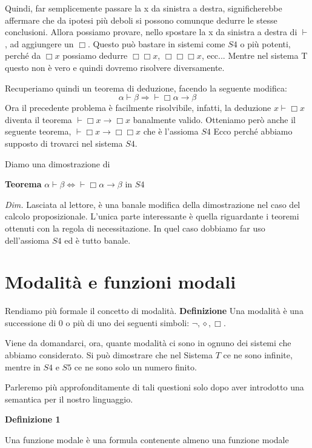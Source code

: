 \documentclass[a4paper, 12pt]{article}
\begin{document}
Quindi, far semplicemente passare la x da sinistra a destra, significherebbe affermare che
da ipotesi più deboli si possono comunque dedurre le stesse conclusioni. Allora possiamo provare,
nello spostare la x da sinistra a destra di $\vdash$, ad aggiungere un $\Box$.
Questo può bastare in sistemi come $S4$ o più potenti, perché da $\Box x$ possiamo dedurre
$\Box \Box x$, $\Box \Box \Box x$, ecc...
Mentre nel sistema T questo non è vero e quindi dovremo risolvere diversamente.

Recuperiamo quindi un teorema di deduzione, facendo la seguente modifica:
$$\alpha \vdash \beta \Rightarrow \vdash \Box \alpha \rightarrow \beta$$
Ora il precedente problema è facilmente risolvibile, infatti, la deduzione $x \vdash \Box x$
diventa il teorema $\vdash \Box x \rightarrow \Box x$ banalmente valido.
Otteniamo però anche il seguente teorema, $\vdash \Box x \rightarrow \Box \Box x$ che è l'assioma $S4$
Ecco perché abbiamo supposto di trovarci nel sistema $S4$.

Diamo una dimostrazione di

\begin{flushleft}
\textbf{Teorema}
$\alpha \vdash \beta \Leftrightarrow \vdash \Box \alpha \rightarrow \beta$ in $S4$

\textit{Dim.}
Lasciata al lettore, è una banale modifica della dimostrazione nel caso del calcolo proposizionale.
L'unica parte interessante è quella riguardante i teoremi ottenuti con la regola di necessitazione.
In quel caso dobbiamo far uso dell'assioma $S4$ ed è tutto banale.
\end{flushleft}



\section{Modalità e funzioni modali}
Rendiamo più formale il concetto di modalità.
\textbf{Definizione}
Una modalità è una successione di 0 o più di uno dei seguenti simboli: $\neg,\diamond,\Box$.

Viene da domandarci, ora, quante modalità ci sono in ognuno dei sistemi che abbiamo considerato.
Si può dimostrare che nel Sistema $T$ ce ne sono infinite,
mentre in $S4$ e $S5$ ce ne sono solo un numero finito.

Parleremo più approfonditamente di tali questioni solo dopo aver introdotto una semantica
per il nostro linguaggio.

\begin{flushleft}
\textbf{Definizione 1}

Una funzione modale è una formula contenente almeno una funzione modale
\end{flushleft}
\end{document}
